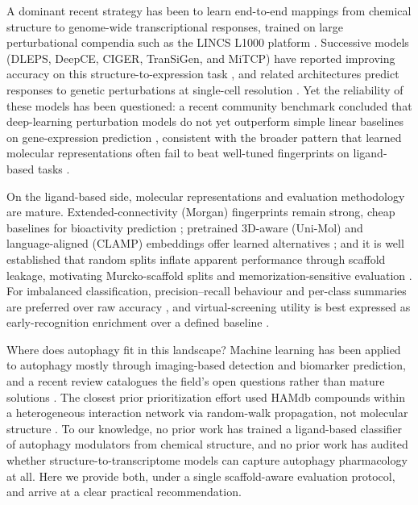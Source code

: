 \documentclass[11pt]{article}
\begin{document}
A dominant recent strategy has been to learn end-to-end mappings from
chemical structure to genome-wide transcriptional responses, trained on
large perturbational compendia such as the LINCS L1000 platform
\cite{subramanian2017}. Successive models (DLEPS, DeepCE, CIGER,
TranSiGen, and MiTCP) have reported improving accuracy on this
structure-to-expression task \cite{dleps,deepce,ciger,transigen,mitcp}, and
related architectures predict responses to genetic perturbations at
single-cell resolution \cite{scgen,gears}. Yet the reliability of these models
has been questioned: a recent community benchmark concluded that
deep-learning perturbation models do not yet outperform simple linear
baselines on gene-expression prediction \cite{ahlmann2025}, consistent with
the broader pattern that learned molecular representations often fail to beat
well-tuned fingerprints on ligand-based tasks \cite{praski2025}.

On the ligand-based side, molecular representations and evaluation
methodology are mature. Extended-connectivity (Morgan) fingerprints remain
strong, cheap baselines for bioactivity prediction \cite{rogers2010}; pretrained
3D-aware (Uni-Mol) and language-aligned (CLAMP) embeddings offer learned
alternatives \cite{unimol,clamp}; and it is well established that random
splits inflate apparent performance through scaffold leakage, motivating
Murcko-scaffold splits and memorization-sensitive evaluation
\cite{bemis1996,moleculenet,wallach2018}. For imbalanced classification,
precision--recall behaviour and per-class summaries are preferred over raw
accuracy \cite{saito2015}, and virtual-screening utility is best expressed as
early-recognition enrichment over a defined baseline \cite{truchon2007}.

Where does autophagy fit in this landscape? Machine learning has been applied
to autophagy mostly through imaging-based detection and biomarker prediction,
and a recent review catalogues the field's open questions rather than mature
solutions \cite{yang2024review}. The closest prior prioritization effort used
HAMdb compounds within a heterogeneous interaction network via random-walk
propagation, not molecular structure \cite{huang2024rw}. To our knowledge, no
prior work has trained a ligand-based classifier of autophagy modulators from
chemical structure, and no prior work has audited whether
structure-to-transcriptome models can capture autophagy pharmacology at all.
Here we provide both, under a single scaffold-aware evaluation protocol, and
arrive at a clear practical recommendation.
\end{document}

